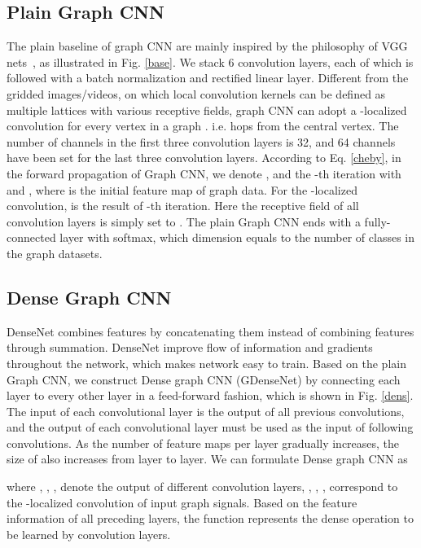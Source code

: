 \documentclass[journal]{IEEEtran}
\begin{document}
\subsection{Plain Graph CNN}
The plain baseline of graph CNN are mainly inspired by the philosophy of VGG nets~\cite{vgg}, as illustrated in Fig. \ref{base}.
We stack 6 convolution layers, each of which is followed with a batch normalization and rectified linear layer.
Different from the gridded images/videos, on which local convolution kernels can be defined as multiple lattices with various receptive fields, graph CNN can adopt a -localized convolution for every vertex in a graph \cite{defferrard2016conv}. i.e.  hops from the central vertex.
The number of channels in the first three convolution layers is 32, and 64 channels have been set for the last three convolution layers.
According to Eq. \ref{cheby}, in the forward propagation of Graph CNN, we denote , and the -th iteration  with  and , where  is the initial feature map of graph data. For the -localized convolution,  is the result of -th iteration.
Here the receptive field  of all convolution layers is simply set to .
The plain Graph CNN ends with a fully-connected layer with softmax, which dimension equals to the number of classes in the graph datasets.

\subsection{Dense Graph CNN}
DenseNet combines features by concatenating them instead of combining features through summation. DenseNet improve flow of information and gradients throughout the network, which makes network easy to train.
Based on the plain Graph CNN, we construct Dense graph CNN (G\underline{\hspace{0.5em}}DenseNet) by connecting each layer to every other layer in a feed-forward fashion, which is shown in Fig. \ref{dens}.
The input of each convolutional layer is the output of all previous convolutions, and the output of each convolutional layer must be used as the input of following convolutions.
As the number of feature maps per layer gradually increases, the size of  also increases from layer to layer. We can formulate Dense graph CNN as

where , , ,  denote the output of different convolution layers, , , ,  correspond to the -localized convolution of input graph signals.
Based on the feature information of all preceding layers, the function  represents the dense operation to be learned by convolution layers.
\end{document}
